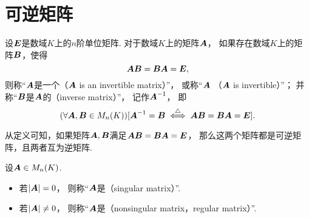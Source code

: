 \section{可逆矩阵}

\begin{definition}\label{definition:可逆矩阵.可逆矩阵的定义}
设\(\boldsymbol{E}\)是数域\(K\)上的\(n\)阶单位矩阵.
对于数域\(K\)上的矩阵\(\boldsymbol{A}\)，
如果存在数域\(K\)上的矩阵\(\boldsymbol{B}\)，使得\begin{equation*}
	\boldsymbol{A}\boldsymbol{B}=\boldsymbol{B}\boldsymbol{A}=\boldsymbol{E},
\end{equation*}
则称“\(\boldsymbol{A}\)是一个（\(\boldsymbol{A}\) is an invertible matrix）”，
或称“\(\boldsymbol{A}\) （\(\boldsymbol{A}\) is invertible）”；
并称“\(\boldsymbol{B}\)是\(\boldsymbol{A}\)的（inverse matrix）”，
记作\(\boldsymbol{A}^{-1}\)，
即\begin{equation*}
	(\forall \boldsymbol{A},\boldsymbol{B}\in M_n(K))
	[\boldsymbol{A}^{-1} = \boldsymbol{B} \overset{\triangle}{\iff} \boldsymbol{A}\boldsymbol{B}=\boldsymbol{B}\boldsymbol{A}=\boldsymbol{E}].
\end{equation*}
\end{definition}

从定义可知，如果矩阵\(\boldsymbol{A},\boldsymbol{B}\)满足\(\boldsymbol{A}\boldsymbol{B}=\boldsymbol{B}\boldsymbol{A}=\boldsymbol{E}\)，
那么这两个矩阵都是可逆矩阵，且两者互为逆矩阵.

\begin{definition}
设\(\boldsymbol{A} \in M_n(K)\).
\begin{itemize}
	\item 若\(\abs{\boldsymbol{A}}=0\)，
	则称“\(\boldsymbol{A}\)是（singular matrix）”.
	\item 若\(\abs{\boldsymbol{A}} \neq 0\)，
	则称“\(\boldsymbol{A}\)是（nonsingular matrix，regular matrix）”.
\end{itemize}
\end{definition}

